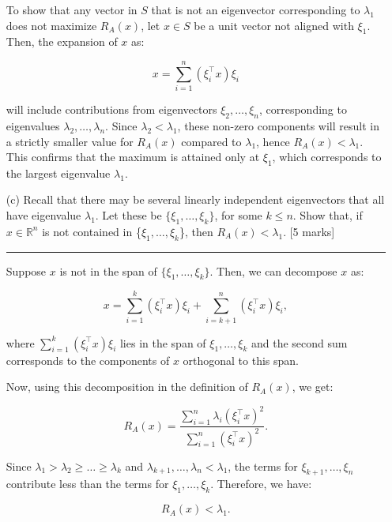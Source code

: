 \documentclass{article}
\begin{document}
\begin{enumerate}
    \vspace{1.5em}
    
    \noindent To show that any vector in \( S \) that is not an eigenvector corresponding to \( \lambda_1 \) does not maximize \( R_A(x) \), let \( x \in S \) be a unit vector not aligned with \( \xi_1 \). Then, the expansion of \( x \) as:

    \[
    x = \sum_{i=1}^n (\xi_i^\top x) \xi_i
    \]

    will include contributions from eigenvectors \( \xi_2, \dots, \xi_n \), corresponding to eigenvalues \( \lambda_2, \dots, \lambda_n \). Since \( \lambda_2 < \lambda_1 \), these non-zero components will result in a strictly smaller value for \( R_A(x) \) compared to \( \lambda_1 \), hence \( R_A(x) < \lambda_1 \). This confirms that the maximum is attained only at \( \xi_1 \), which corresponds to the largest eigenvalue \( \lambda_1 \).

    \vspace{0.8em}


    \item[(c)] Recall that there may be several linearly independent eigenvectors that all have eigenvalue \( \lambda_1 \). Let these be \( \{\xi_1, \dots, \xi_k\} \), for some \( k \leq n \). Show that, if \( x \in \mathbb{R}^n \) is not contained in \{$\xi_1, \dots, \xi_k$\}, then \( R_A(x) < \lambda_1 \). [5 marks]

    \noindent\textcolor{gray}{\rule{0.1\linewidth}{0.4pt}}
    \vspace{10pt}

    
    Suppose \( x \) is not in the span of \( \{\xi_1, \dots, \xi_k\} \). Then, we can decompose \( x \) as:
    
    \begin{equation}
    x = \sum_{i=1}^k (\xi_i^\top x) \xi_i + \sum_{i=k+1}^n (\xi_i^\top x) \xi_i,
    \end{equation}
    
    where \( \sum_{i=1}^k (\xi_i^\top x) \xi_i \) lies in the span of \( \xi_1, \dots, \xi_k \) and the second sum corresponds to the components of \( x \) orthogonal to this span.
    
    Now, using this decomposition in the definition of \( R_A(x) \), we get:
    
    \begin{equation}
    R_A(x) = \frac{\sum_{i=1}^n \lambda_i (\xi_i^\top x)^2}{\sum_{i=1}^n (\xi_i^\top x)^2}.
    \end{equation}
    
    Since \( \lambda_1 > \lambda_2 \geq \dots \geq \lambda_k \) and \( \lambda_{k+1}, \dots, \lambda_n < \lambda_1 \), the terms for \( \xi_{k+1}, \dots, \xi_n \) contribute less than the terms for \( \xi_1, \dots, \xi_k \). Therefore, we have:
    
    \[
    R_A(x) < \lambda_1.
    \]
    
\end{enumerate}
    
    
\end{document}
